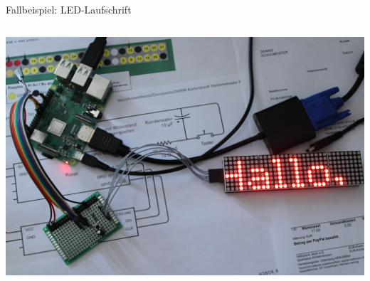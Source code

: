 \begin{frame}{Fallbeispiel: LED-Laufschrift}
\begin{columns}
        \includegraphics[width=\textwidth]{img/laufschrift_pi2}
    \end{columns}
\end{frame}

